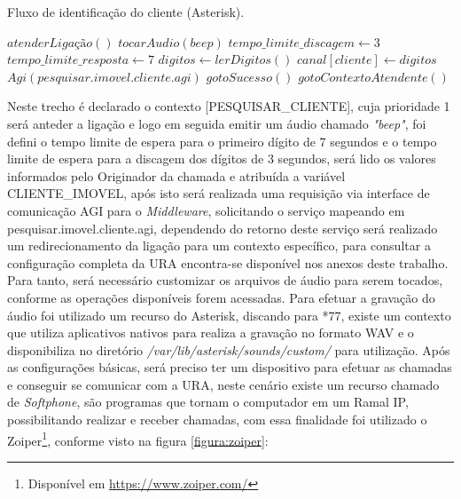 
\begin{algorithm}
	\caption{Fluxo de identificação do cliente (Asterisk).}	
	\label{algoritmo:FluxoIdentificaoCliente}
	\begin{algorithmic}[1]
		\STATE $atenderLigação()$ 
		\STATE $tocarAudio(beep)$   
		\STATE $tempo\_limite\_discagem \gets 3$  		 
		\STATE $tempo\_limite\_resposta \gets 7$  
		\STATE $digitos  \gets lerDigitos()$  
		\STATE $canal [cliente]  \gets digitos$   
		\STATE $Agi(pesquisar.imovel.cliente.agi)$  
		\STATE $gotoSucesso()$  
		\ELSE
		\STATE $ gotoContextoAtendente()$  
		\ENDIF		
	\end{algorithmic}
\end{algorithm}


Neste trecho é declarado o contexto [PESQUISAR\_CLIENTE], cuja prioridade 1 será anteder a ligação e logo em seguida emitir um áudio chamado \textit{"beep"}, foi defini o tempo limite de espera para o primeiro dígito de 7 segundos e o tempo limite de espera para a discagem dos dígitos de 3 segundos, será lido os valores informados pelo Originador da chamada e atribuída a variável CLIENTE\_IMOVEL, após isto será realizada uma requisição via interface de comunicação  AGI para o \textit{Middleware}, solicitando o serviço mapeando em pesquisar.imovel.cliente.agi, dependendo do retorno deste serviço será realizado um redirecionamento da ligação para um contexto específico, para consultar a configuração completa da URA encontra-se disponível nos anexos deste trabalho.
Para tanto, será necessário customizar os arquivos de áudio para serem tocados, conforme as operações disponíveis forem acessadas. Para efetuar a gravação do áudio foi utilizado um recurso do Asterisk, discando para *77, existe um contexto que utiliza aplicativos nativos para realiza a gravação no formato WAV e o disponibiliza no diretório \textit{/var/lib/asterisk/sounds/custom/} para utilização.
Após as configurações básicas, será preciso ter um dispositivo para efetuar as chamadas e conseguir se comunicar com a URA, neste cenário existe um recurso chamado de \textit{Softphone}, são programas que tornam o computador em um Ramal IP, possibilitando realizar e receber chamadas, com essa finalidade foi utilizado o Zoiper\footnote{Disponível em \url{https://www.zoiper.com/}}, conforme visto na figura \ref{figura:zoiper}:

